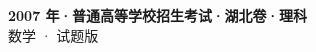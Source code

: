 \documentclass[zihao=-4, a4paper]{ctexart}
\begin{document}
\begin{center}
  {\Large\bfseries 2007 年·普通高等学校招生考试·湖北卷·理科}\\[4pt]
  {\large 数学 · 试题版}
\end{center}
\medskip
{}

\end{document}
